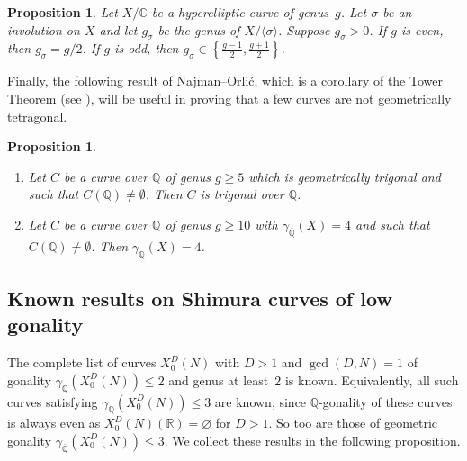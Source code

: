 \documentclass[11pt,reqno]{amsart}
\newcommand{\Q}{\mathbb{Q}}
\newcommand{\Qbar}{\overline{\Q}}
\newcommand{\R}{\mathbb{R}}
\newcommand{\C}{\mathbb{C}}
\newtheorem{proposition}[theorem]{Proposition}
\theoremstyle{definition}
\newcommand{\Pietro}[1]{{\color{orange}{??Pietro: #1}}} %
\begin{document}
\begin{proposition}\cite[Proposition~4]{Hasegawa97}\label{proposition: not_hyperelliptic}
Let $X/\C$ be a hyperelliptic curve of genus~$g$. Let $\sigma$ be an involution on $X$ %
and let $g_\sigma$ be the genus of $X/\langle \sigma \rangle$. Suppose $g_\sigma > 0$. If $g$ is even, then $g_\sigma = g/2$. If $g$ is odd, then $g_\sigma \in \left\{  \frac{g-1}{2} , \frac{g + 1}{2}\right\}$. 
\end{proposition}

Finally, the following result of Najman--Orli\'{c}, which is a corollary of the Tower Theorem (see \cite[Theorem 4.4]{NO24}), will be useful in proving that a few curves are not geometrically tetragonal. 
\begin{proposition}\cite[Corollary 4.6]{NO24}\label{prop: NO_corollary}
\begin{enumerate}
    \item Let $C$ be a curve over $\Q$ of genus $g \geq 5$ which is geometrically trigonal and such that $C(\Q) \neq \emptyset$. Then $C$ is trigonal over $\Q$.
    \item Let $C$ be a curve over $\Q$ of genus $g \geq 10$ with $\gamma_{\Qbar}(X) = 4$ and such that $C(\Q) \neq \emptyset$. Then $\gamma_\Q(X) = 4$. 
\end{enumerate}
\end{proposition}






\subsection{Known results on Shimura curves of low gonality}

The complete list of curves $X_0^D(N)$ with $D>1$ and $\gcd(D,N) = 1$ of gonality $\gamma_\Q(X_0^D(N)) \leq 2$ and genus at least~$2$ is known. Equivalently, all such curves satisfying $\gamma_\Q(X_0^D(N)) \leq 3$ are known, since $\Q$-gonality of these curves is always even as $X_0^D(N)(\R) = \varnothing$ for $D>1$. So too are those of geometric gonality $\gamma_{\Qbar}(X_0^D(N)) \leq 3$. We collect these results in the following proposition. 
\end{document}
